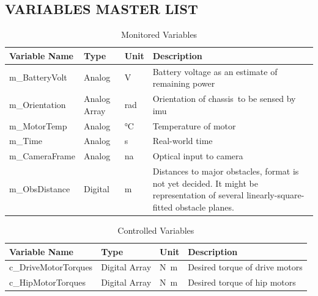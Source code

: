 \documentclass[12pt]{article}
\begin{document}
\subsection{VARIABLES MASTER LIST} \label{sec:VARIABLES MASTER LIST}
\begin{table}[H]
    \caption{Monitored Variables}
    \begin{tabularx}{\textwidth}{|p{3cm}|p{1.5cm}|p{1.25cm}|X|}
        \toprule
        \textbf{Variable Name} & \textbf{Type} & \textbf{Unit}   & \textbf{Description}                                    \\
        \midrule
        m\_BatteryVolt         & Analog        & \unit{\volt}    & Battery voltage as an estimate of remaining power       \\
        m\_Orientation         & Analog Array  & \unit{\radian}  & Orientation of chassis\, to be sensed by \acrshort{imu} \\
        m\_MotorTemp           & Analog        & \unit{\celsius} & Temperature of motor                                    \\
        m\_Time                & Analog        & \unit{\second}  & Real-world time                                         \\
        m\_CameraFrame         & Analog        & \acrshort{na}   & Optical input to camera                                 \\
        m\_ObsDistance         & Digital        & m   &  Distances to major obstacles, format is not yet decided. It might be representation of several linearly-square-fitted obstacle planes.    \\
        \bottomrule
    \end{tabularx}
\end{table}

\begin{table}[H]
    \caption{Controlled Variables}
    \begin{tabularx}{\textwidth}{|p{4cm}|p{2.5cm}|p{1cm}|X|}
        \toprule
        \textbf{Variable Name} & \textbf{Type} & \textbf{Unit} & \textbf{Description}           \\
        \midrule
        c\_DriveMotorTorques   & Digital Array & \unit{N.m}    & Desired torque of drive motors \\
        c\_HipMotorTorques     & Digital Array & \unit{N.m}    & Desired torque of hip motors   \\
        \bottomrule
    \end{tabularx}
\end{table}
\end{document}
